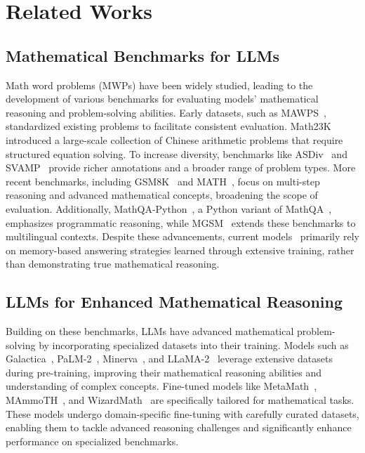 \section{Related Works}


\subsection{Mathematical Benchmarks for LLMs}

Math word problems (MWPs) have been widely studied, leading to the development of various benchmarks for evaluating models' mathematical reasoning and problem-solving abilities. Early datasets, such as MAWPS~\citep{MAWPS}, standardized existing problems to facilitate consistent evaluation. Math23K~\citep{Math23k} introduced a large-scale collection of Chinese arithmetic problems that require structured equation solving. To increase diversity, benchmarks like ASDiv~\citep{ASDiv} and SVAMP~\citep{SVAMP} provide richer annotations and a broader range of problem types. More recent benchmarks, including GSM8K~\citep{cobbe2021gsm8k} and MATH~\citep{MATH}, focus on multi-step reasoning and advanced mathematical concepts, broadening the scope of evaluation. Additionally, MathQA-Python~\citep{MathQA_py}, a Python variant of MathQA~\citep{MathQA}, emphasizes programmatic reasoning, while MGSM~\citep{MGSM} extends these benchmarks to multilingual contexts. Despite these advancements, current models~\citep{math_reason_survey, lu2023chameleon} primarily rely on memory-based answering strategies learned through extensive training, rather than demonstrating true mathematical reasoning.


\subsection{LLMs for Enhanced Mathematical Reasoning}

Building on these benchmarks, LLMs have advanced mathematical problem-solving by incorporating specialized datasets into their training. Models such as Galactica~\citep{Galactica}, PaLM-2~\citep{palm2}, Minerva~\citep{Minerva}, and LLaMA-2~\citep{llama2} leverage extensive datasets during pre-training, improving their mathematical reasoning abilities and understanding of complex concepts. Fine-tuned models like MetaMath~\citep{MetaMath}, MAmmoTH~\citep{MAmmoTH}, and WizardMath~\citep{WizardMath} are specifically tailored for mathematical tasks. These models undergo domain-specific fine-tuning with carefully curated datasets, enabling them to tackle advanced reasoning challenges and significantly enhance performance on specialized benchmarks.


